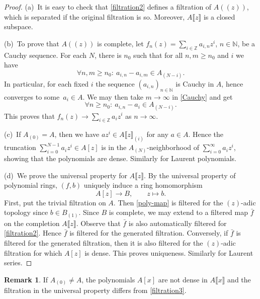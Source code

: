 \documentclass[10pt,a4paper]{amsart}
\numberwithin{equation}{section}
\theoremstyle{definition}
\newtheorem{Remark}[Theorem]{Remark}
\def\lb{\llbracket}
\def\rb{\rrbracket}
\begin{document}
\begin{proof}
 (a)~It is easy to check that \eqref{filtration2} defines a filtration of $A(\!( z)\!)$, which is separated if the original filtration is so. Moreover, $A\lb z\rb$ is a closed subspace.

 (b)~To prove that $A(\!( z)\!)$ is complete, let $f_n(z)=\sum_{i\in\mathbb{Z}} a_{i,n}z^i$, $n\in\mathbb{N}$, be a Cauchy sequence. For each $N$, there is $n_0$ such that for all $n,m\geqslant n_0$ and $i$ we have
 \begin{equation} \label{Cauchy}
 \forall n,m\geqslant n_0\colon \ a_{i,n}-a_{i,m}\in A_{(N-i)}.
 \end{equation}
 In particular, for each fixed $i$ the sequence $(a_{i,n})_{n\in\mathbb{N}}$ is Cauchy in $A$, hence converges to some~${a_i\in A}$. We may then take $m\to\infty$ in \eqref{Cauchy} and get
 \[
 \forall n\geqslant n_0\colon\ a_{i,n}-a_i\in A_{(N-i)}.
 \]
 This proves that $f_n(z)\to \sum_{i\in\mathbb{Z}} a_iz^i$ as $n\to\infty$.

 (c)~If $A_{(0)}=A$, then we have $az^i\in A\lb z\rb_{(i)}$ for any $a\in A$. Hence the truncation $\sum_{i=0}^{N-1} a_iz^i\in A[z]$ is in the $A_{(N)}$-neighborhood of $\sum_{i=0}^\infty a_iz^i$, showing that the polynomials are dense. Similarly for Laurent polynomials.

 (d)~We prove the universal property for $A\lb z\rb$. By the universal property of polynomial rings, $(f,b)$ uniquely induce a ring homomorphism
 \begin{equation}
 \label{poly-map}
 A[z]\longrightarrow B,\qquad z\longmapsto b.
 \end{equation}
 First, put the trivial filtration on $A$. Then \eqref{poly-map} is filtered for the $(z)$-adic topology since ${b\in B_{(1)}}$. Since $B$ is complete, we may extend to a filtered map $\bar{f}$ on the completion $A\lb z\rb$. Observe that $\bar{f}$ is also automatically filtered for \eqref{filtration2}. Hence $\bar{f}$ is filtered for the generated filtration. Conversely, if $\bar{f}$ is filtered for the generated filtration, then it is also filtered for the $(z)$-adic filtration for which $A[z]$ is dense. This proves uniqueness. Similarly for Laurent series.
\end{proof}

\begin{Remark}
 If $A_{(0)}\neq A$, the polynomials $A[x]$ are not dense in $A\lb x\rb$ and the filtration in the universal property differs from \eqref{filtration3}.
\end{Remark}
\end{document}
